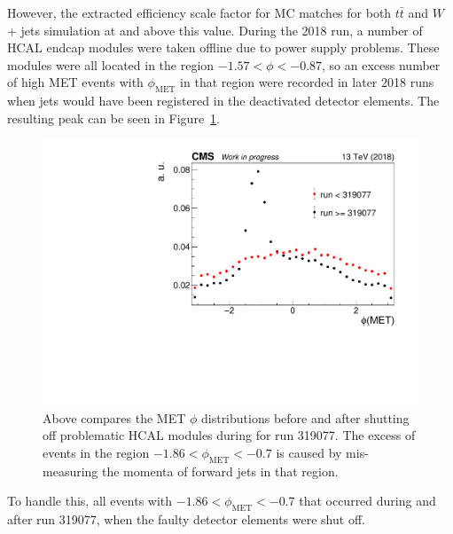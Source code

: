 However, the extracted efficiency scale factor for MC matches
for both $t\bar{t}$ and $W$ + jets simulation at and above this value.
During the 2018 run, a number of HCAL endcap modules were taken offline
due to power supply problems.
These modules were all located in the region $-1.57 < \phi < -0.87$,
so an excess number of high MET events with $\phi_\mathrm{MET}$ in that region were recorded
in later 2018 runs when jets would have been registered in the deactivated detector elements.
The resulting peak can be seen in Figure~\ref{fig:met-peak}.
\begin{figure}
  \centering
  \includegraphics[width=0.8\linewidth]{figures/METPhi319077.pdf}
  \caption[MET $\phi$ distribution before and after shutting off HCAL modules]{
    Above compares the MET $\phi$ distributions before and after shutting off
    problematic HCAL modules during for run 319077.
    The excess of events in the region $-1.86 < \phi_\mathrm{MET} < -0.7$
    is caused by mis-measuring the momenta of forward jets in that region.
  }
  \label{fig:met-peak}
\end{figure}
To handle this, all events with $-1.86 < \phi_\mathrm{MET} < -0.7$ that occurred
during and after run 319077, when the faulty detector elements were shut off.

